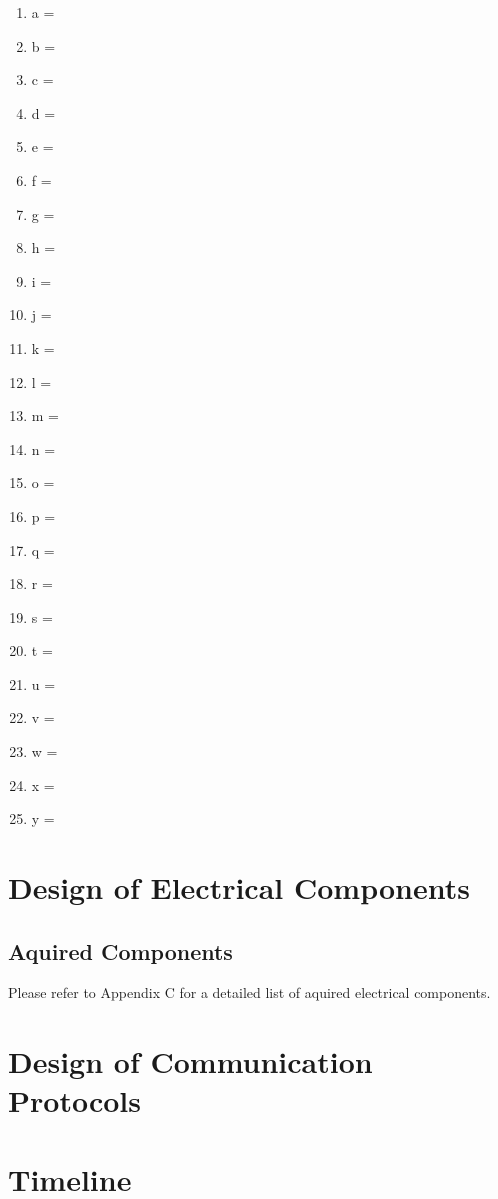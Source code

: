 \documentclass[12pt, titlepage]{article}
\begin{document}
\begin{enumerate}
  \item a =
  \item b =
  \item c =
  \item d =
  \item e =
  \item f =
  \item g =
  \item h =
  \item i =
  \item j =
  \item k =
  \item l =
  \item m =
  \item n =
  \item o =
  \item p =
  \item q =
  \item r =
  \item s =
  \item t =
  \item u =
  \item v =
  \item w =
  \item x =
  \item y =
\end{enumerate}

\section{Design of Electrical Components}
\subsection*{Aquired Components}
Please refer to Appendix C for a detailed list of aquired electrical components.


\section{Design of Communication Protocols}


\section{Timeline}
\end{document}

